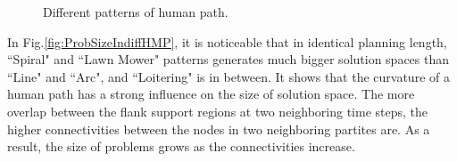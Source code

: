 \documentclass[12pt]{article}
\begin{document}
\begin{figure}[H] 
  \centering 
  \caption{Different patterns of human path.} 
  \label{fig:diffHMP} %
\end{figure}

In Fig.\ref{fig:ProbSizeIndiffHMP}, it is noticeable that in identical planning length, ``Spiral" and ``Lawn Mower" patterns generates much bigger solution spaces than ``Line" and ``Arc", and ``Loitering" is in between. It shows that the curvature of a human path has a strong influence on the size of solution space. The more overlap between the flank support regions at two neighboring time steps, the higher connectivities between the nodes in two neighboring partites are. As a result, the size of problems grows as the connectivities increase. 
\end{document}
